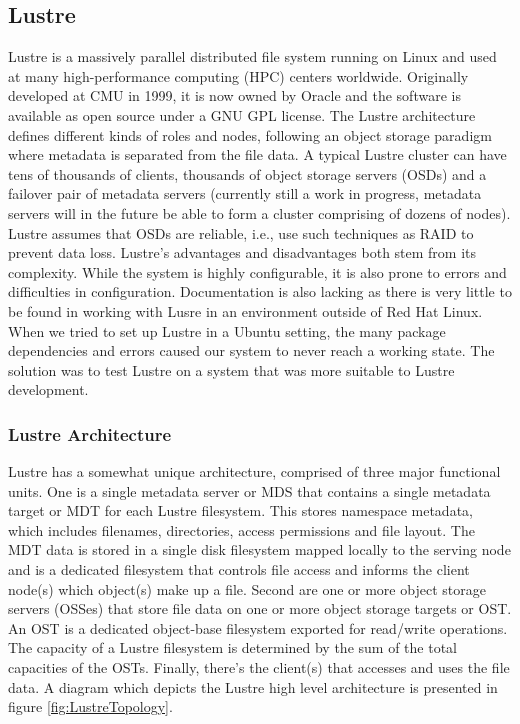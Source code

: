 \documentclass[11pt]{article}
\begin{document}
\subsection{Lustre}
Lustre is a massively parallel distributed file system running on Linux 
and used at many high-performance computing (HPC) centers worldwide. 
Originally developed at CMU in 1999, it is now owned by Oracle and the 
software is available as open source under a GNU GPL license. The Lustre 
architecture defines different kinds of roles and nodes, following an object 
storage paradigm where metadata is separated from the file data. A typical 
Lustre cluster can have tens of thousands of clients, thousands of object 
storage servers (OSDs) and a failover pair of metadata servers (currently 
still a work in progress, metadata servers will in the future be able to 
form a cluster comprising of dozens of nodes). Lustre assumes that OSDs 
are reliable, i.e., use such techniques as RAID to prevent data loss.
Lustre's advantages and disadvantages both stem from its complexity. 
While the system is highly configurable, it is also prone to errors and
difficulties in configuration. Documentation is also lacking as there is
very little to be found in working with Lusre in an environment outside
of Red Hat Linux. When we tried to set up Lustre in a Ubuntu setting, the
many package dependencies and errors caused our system to never reach a
working state. The solution was to test Lustre on a system that was more
suitable to Lustre development.

\subsubsection{Lustre Architecture}
Lustre has a somewhat unique architecture, comprised of three major 
functional units. One is a single metadata server or MDS that contains 
a single metadata target or MDT for each Lustre filesystem. This stores 
namespace metadata, which includes filenames, directories, access 
permissions and file layout. The MDT data is stored in a single disk 
filesystem mapped locally to the serving node and is a dedicated 
filesystem that controls file access and informs the client node(s) 
which object(s) make up a file. Second are one or more object storage 
servers (OSSes) that store file data on one or more object storage 
targets or OST. An OST is a dedicated object-base filesystem exported 
for read/write operations. The capacity of a Lustre filesystem is 
determined by the sum of the total capacities of the OSTs. Finally, 
there's the client(s) that accesses and uses the file data. A diagram 
which depicts the Lustre high level architecture is presented in
figure \ref{fig:LustreTopology}.
\end{document}

